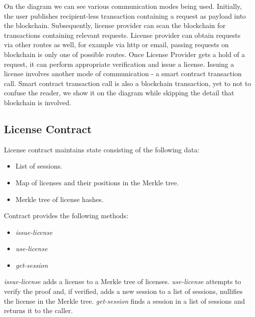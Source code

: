 On the diagram we can see various communication modes being used. Initially, the user publishes recipient-less transaction containing a request as payload into the blockchain. Subsequently, license provider can scan the blockchain for transactions containing relevant requests. License provider can obtain requests via other routes as well, for example via http or email, passing requests on blockchain is only one of possible routes. Once License Provider gets a hold of a request, it can perform appropriate verification and issue a license. Issuing a license involves another mode of communication - a smart contract transaction call. Smart contract transaction call is also a blockchain transaction, yet to not to confuse the reader, we show it on the diagram while skipping the detail that blockchain is involved.

\subsection{License Contract}

\begin{flushleft}
License contract maintains state consisting of the following data:
\end{flushleft}

\begin{itemize}%
	\item List of sessions.
	\item Map of licenses and their positions in the Merkle tree.
	\item Merkle tree of license hashes.
\end{itemize}


\begin{flushleft}
Contract provides the following methods:
\end{flushleft}

\begin{itemize}%
	\item \textit{issue-license}
	\item \textit{use-license}
	\item \textit{get-session}
\end{itemize}


\begin{flushleft}
\textit{issue-license} adds a license to a Merkle tree of licenses. \textit{use-license} attempts to verify the proof and, if verified, adds a new session to a list of sessions, nullifies the license in the Merkle tree. \textit{get-session} finds a session in a list of sessions and returns it to the caller.
\end{flushleft}


